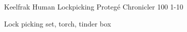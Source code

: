 \begin{filledCS}%
  {Keelfrak}%
  {Human}%
  {Lockpicking Proteg\'e}%
  {Chronicler}%
  {{1}{0}{0}}%
  {{1}{-1}{0}}%
  {%
    \renewcommand\rank{Digger}

    \setcounter{Academics}{1}
    \setcounter{Crafts}{2}
    \setcounter{Larceny}{1}
    \setcounter{Melee}{1}
    \longsword
    \partialchain
  }%
  {}%
  {Lock picking set, torch, tinder box}%

\end{filledCS}

\renewcommand\csComments{}

